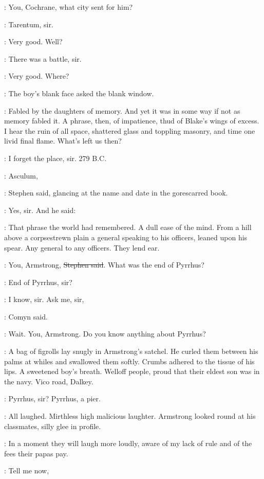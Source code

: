 \Stephen:
You, Cochrane, what city sent for him?

\cochrane:
Tarentum, sir.

\Stephen:
Very good. Well?

\cochrane:
There was a battle, sir.

\Stephen:
Very good.
Where?

:
The boy's blank face asked the blank window.

\StephenInt:
Fabled by the daughters of memory.
And yet it was in some way if not as memory fabled it.
A phrase, then, of impatience, thud of Blake's wings of excess.
I hear the ruin of all space, shattered glass and toppling masonry,
and time one livid final flame.
What's left us then?

\cochrane:
I forget the place, sir.
279 B.C.

\Stephen:
Asculum,

:
Stephen said, glancing at the name and date in the gorescarred book.

\cochrane:
Yes, sir.
And he said: 

\StephenInt:
That phrase the world had remembered.
A dull ease of the mind.
From a hill above a corpsestrewn plain
a general speaking to his officers, leaned upon his spear.
Any general to any officers.
They lend ear.

\Stephen:
You, Armstrong, \sout{Stephen said}.
What was the end of Pyrrhus?

\armstrong:
End of Pyrrhus, sir?

\comyn:
I know, sir.
Ask me, sir,

:
Comyn said.

\Stephen:
Wait.
You, Armstrong.
Do you know anything about Pyrrhus?

:
A bag of figrolls lay snugly in Armstrong's satchel.
He curled them between his palms at whiles and swallowed them softly.
Crumbs adhered to the tissue of his lips.
A sweetened boy's breath.
Welloff people, proud that their eldest son was in the navy.
Vico road, Dalkey.

\armstrong:
Pyrrhus, sir?
Pyrrhus, a pier.

:
All laughed.
Mirthless high malicious laughter.
Armstrong looked round at his classmates, silly glee in profile.

\StephenInt:
In a moment they will laugh more loudly,
aware of my lack of rule and of the fees their papas pay.

\Stephen:
Tell me now,

